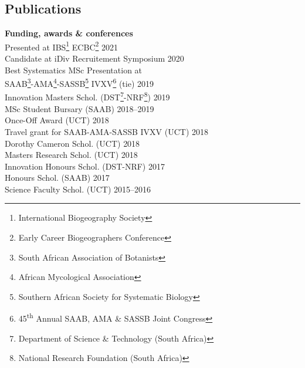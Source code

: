 \documentclass[10pt]{article}
\begin{document}


\bigskip



\subsection*{Publications} %



\hrulefill

\begin{multicols}{2}

\textbf{Funding, awards \& conferences}\\ %

Presented at IBS\footnote{International Biogeography Society}
  ECBC\footnote{Early Career Biogeographers Conference}  \hfill {\small 2021} \\
Candidate at iDiv Recruitement Symposium                 \hfill {\small 2020} \\
Best Systematics MSc Presentation at \\
\hspace{2em} SAAB\footnote{South African Association of Botanists}-AMA\footnote{
  African Mycological Association}-SASSB\footnote{Southern African Society for
  Systematic Biology} IVXV\footnote{45\textsuperscript{th} Annual SAAB, AMA \&
  SASSB Joint Congress} (tie)                            \hfill {\small 2019} \\
Innovation Masters Schol. {\small (DST\footnote{Department of
  Science \& Technology (South Africa)}-NRF\footnote{National Research
  Foundation (South Africa)})}                           \hfill {\small 2019} \\
MSc Student Bursary {\small (SAAB)}                \hfill {\small 2018--2019} \\
Once-Off Award {\small (UCT)}                            \hfill {\small 2018} \\
Travel grant for SAAB-AMA-SASSB IVXV {\small (UCT)}      \hfill {\small 2018} \\
Dorothy Cameron Schol. {\small (UCT)}                    \hfill {\small 2018} \\
Masters Research Schol. {\small (UCT)}                   \hfill {\small 2018} \\
Innovation Honours Schol. {\small (DST-NRF)}             \hfill {\small 2017} \\
Honours Schol. {\small (SAAB)}                           \hfill {\small 2017} \\
Science Faculty Schol. {\small (UCT)}                 \hfill {\small 2015--2016}


\end{multicols}
\end{document}
